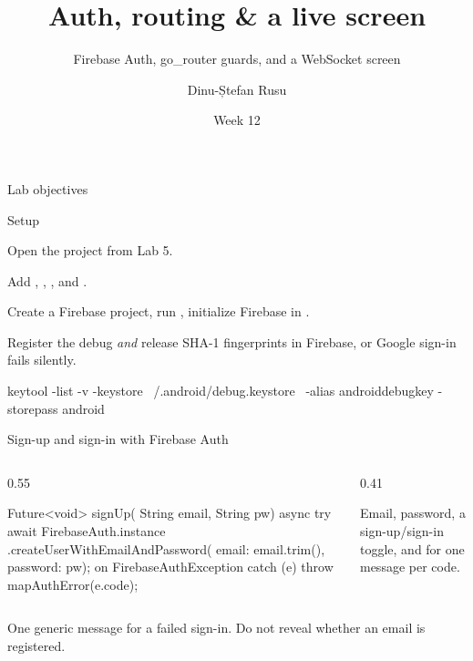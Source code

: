 \documentclass[10pt,aspectratio=169,t]{beamer}
\title{Auth, routing \& a live screen}
\subtitle{Firebase Auth, go\_router guards, and a WebSocket screen}
\author{Dinu-Ștefan Rusu}
\date{Week 12}
\begin{document}
\titleframe

\begin{frame}[eyebrow=Today]{Lab objectives}
  \vskip 2mm
  \begin{grid}[2]
  \end{grid}
  \vskip 6mm
\end{frame}

\begin{frame}[fragile,eyebrow=Setup]{Setup}
  \begin{steps}
    \item Open the project from Lab 5.
    \item Add , , ,  and .
    \item Create a Firebase project, run , initialize Firebase in .
    \item Register the debug \emph{and} release SHA-1 fingerprints in Firebase, or Google sign-in fails silently.
  \end{steps}
  \begin{hint}
\begin{shell}
keytool -list -v -keystore ~/.android/debug.keystore \
  -alias androiddebugkey -storepass android
\end{shell}
  \end{hint}
\end{frame}

\begin{frame}[fragile,eyebrow=Task I]{Sign-up and sign-in with Firebase Auth}
  \begin{columns}[T]
    \begin{column}{0.55\textwidth}
\begin{dart}
Future<void> signUp(
    String email, String pw) async {
  try {
    await FirebaseAuth.instance
        .createUserWithEmailAndPassword(
            email: email.trim(),
            password: pw);
  } on FirebaseAuthException catch (e) {
    throw mapAuthError(e.code);
  }
}
\end{dart}
    \end{column}
    \begin{column}{0.41\textwidth}
      \begin{steps}
        \item Email, password, a sign-up/sign-in toggle, and  for one message per code.
      \end{steps}
    \end{column}
  \end{columns}
  \begin{takeaway}{One generic message for a failed sign-in.}
    Do not reveal whether an email is registered.
  \end{takeaway}
\end{frame}
\end{document}
